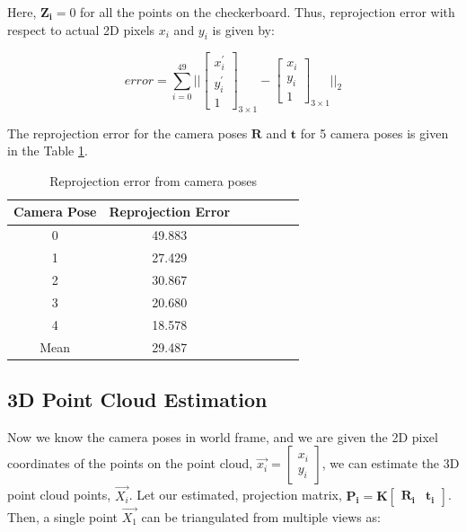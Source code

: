 \documentclass{article}
\begin{document}
Here, $\mathbf{Z_i}=0$ for all the points on the checkerboard. Thus, reprojection error with respect to actual 2D pixels $x_i$ and $y_i$ is given by:


\begin{equation}
    error = \sum_{i=0}^{49} || \begin{bmatrix} x_i^{'} \\ y_i^{'} \\ 1 \end{bmatrix}_{3 \times 1} - \begin{bmatrix} x_i \\ y_i \\ 1 \end{bmatrix}_{3 \times 1} ||_2
\end{equation}

The reprojection error for the camera poses $\mathbf{R}$ and $\mathbf{t}$ for 5 camera poses is given in the Table \ref{tab:reprojection_error_r_t}.

\begin{table}[h]
    \centering
    \begin{tabular}{|c|c|c|c|c|c|c|}
        \hline
        Camera Pose & Reprojection Error \\
        \hline
        0 & 49.883 \\
        1 & 27.429 \\
        2 & 30.867 \\
        3 & 20.680 \\
        4 & 18.578 \\
        Mean & 29.487 \\
        \hline
    \end{tabular}
    \caption{Reprojection error from camera poses}
    \label{tab:reprojection_error_r_t}
\end{table}



\subsection{3D Point Cloud Estimation}
Now we know the camera poses in world frame, and we are given the 2D pixel coordinates of the points on the point cloud, $\vec{x_i} = \begin{bmatrix}
x_i \\ y_i
\end{bmatrix}$, we can estimate the 3D point cloud points, $\vec{X_i}$. Let our estimated, projection matrix, $\mathbf{P_i} = \mathbf{K} \begin{bmatrix} \mathbf{R_i} & \mathbf{t_i} \end{bmatrix}$. 
Then, a single point $\vec{X_1}$ can be triangulated from multiple views as:
\end{document}
